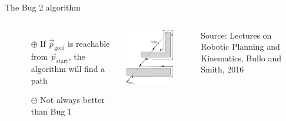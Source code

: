 \documentclass[aspectratio=169]{beamer}
\begin{document}

\begin{frame}{The Bug 2 algorithm}
	\begin{columns}
		\begin{minipage}{\textwidth}\begin{algorithmic}[1]
					\EndWhile						
				\EndIf
				\EndWhile
		\end{algorithmic}\end{minipage}
		\vspace{0.25cm}
		\begin{itemize}
			\item[\color{chameleon3}$\oplus$] If $\vec p_\mathrm{goal}$ is reachable from $\vec p_\mathrm{start}$, the algorithm will find a path
			\item[$\ominus$] Not always better than Bug 1
		\end{itemize}
		\centering
		\includegraphics[width=0.75\textwidth]{media/bug_2_sketch.pdf}\\
		\raggedright
		\footnotesize\textcolor{aluminium4}{Source: Lectures on Robotic Planning and Kinematics, Bullo and Smith, 2016}
	\end{columns}
\end{frame}
\end{document}
